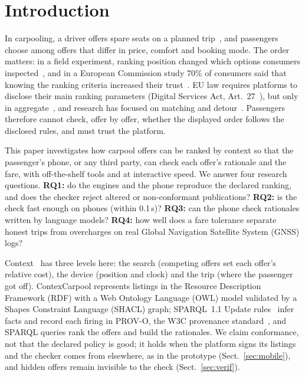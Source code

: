 \documentclass{svproc}
\begin{document}
\section{Introduction}\label{sec:intro}
In carpooling, a driver offers spare seats on a planned trip~\cite{si2023}, and passengers choose among offers that differ in price, comfort and booking mode. The order matters: in a field experiment, ranking position changed which options consumers inspected~\cite{Ursu2018Rankings}, and in a European Commission study 70\% of consumers said that knowing the ranking criteria increased their trust~\cite{EC2018Transparency}. EU law requires platforms to disclose their main ranking parameters (Digital Services Act, Art.~27~\cite{eudsa2022}), but only in aggregate~\cite{Sovrano2024RankingTransparency,Fabbri2025DSAAudit}, and research has focused on matching and detour~\cite{agatz2012}. Passengers therefore cannot check, offer by offer, whether the displayed order follows the disclosed rules, and must trust the platform.

This paper investigates how carpool offers can be ranked by context so that the passenger's phone, or any third party, can check each offer's rationale and the fare, with off-the-shelf tools and at interactive speed. We answer four research questions. \textbf{RQ1:} do the engines and the phone reproduce the declared ranking, and does the checker reject altered or non-conformant publications? \textbf{RQ2:} is the check fast enough on phones (within 0.1\,s)? \textbf{RQ3:} can the phone check rationales written by language models? \textbf{RQ4:} how well does a fare tolerance separate honest trips from overcharges on real Global Navigation Satellite System (GNSS) logs?

Context~\cite{dey2001} has three levels here: the search (competing offers set each offer's relative cost), the device (position and clock) and the trip (where the passenger got off). ContexCarpool represents listings in the Resource Description Framework (RDF) with a Web Ontology Language (OWL) model validated by a Shapes Constraint Language (SHACL) graph; SPARQL~1.1 Update rules~\cite{w3csparql2013} infer facts and record each firing in PROV-O, the W3C provenance standard~\cite{w3cprov2013}, and SPARQL queries rank the offers and build the rationales. We claim conformance, not that the declared policy is good; it holds when the platform signs its listings and the checker comes from elsewhere, as in the prototype (Sect.~\ref{sec:mobile}), and hidden offers remain invisible to the check (Sect.~\ref{sec:verif}).
\end{document}

